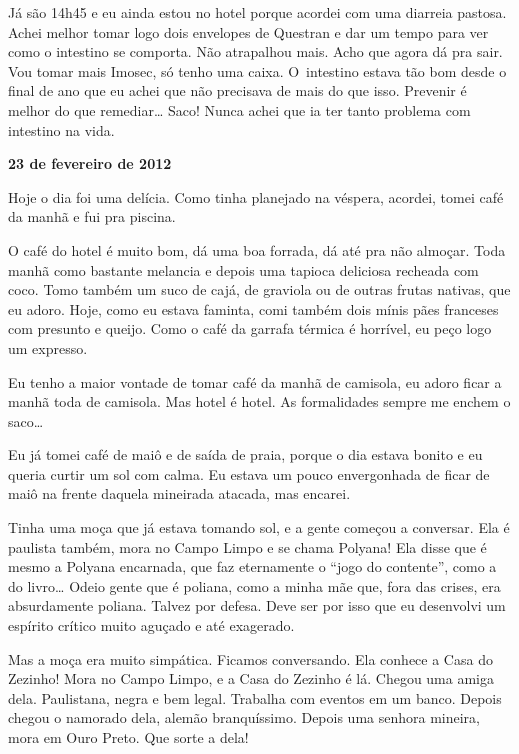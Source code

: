 Já são 14h45 e eu ainda estou no hotel porque acordei com uma diarreia
pastosa. Achei melhor tomar logo dois envelopes de Questran e dar um
tempo para ver como o intestino se comporta. Não atrapalhou mais. Acho
que agora dá pra sair. Vou tomar mais Imosec, só tenho uma caixa. O~intestino estava tão bom desde o final de ano que eu achei que não
precisava de mais do que isso. Prevenir é melhor do que remediar…
Saco! Nunca achei que ia ter tanto problema com intestino na vida.

\begin{center}\asterisc{}\end{center}

\begin{flushright}\textbf{23 de fevereiro de 2012}\end{flushright}


Hoje o dia foi uma delícia. Como tinha planejado na véspera, acordei,
tomei café da manhã e fui pra piscina.

O café do hotel é muito bom, dá uma boa forrada, dá até pra não almoçar.
Toda manhã como bastante melancia e depois uma tapioca deliciosa
recheada com coco. Tomo também um suco de cajá, de graviola ou de outras
frutas nativas, que eu adoro. Hoje, como eu estava faminta, comi também
dois mínis pães franceses com presunto e queijo. Como o café da garrafa
térmica é horrível, eu peço logo um expresso.

Eu tenho a maior vontade de tomar café da manhã de camisola, eu adoro
ficar a manhã toda de camisola. Mas hotel é hotel. As
formalidades sempre me enchem o saco…

Eu já tomei café de maiô e de saída de praia, porque o dia estava bonito
e eu queria curtir um sol com calma. Eu estava um pouco envergonhada de
ficar de maiô na frente daquela mineirada atacada, mas encarei.

Tinha uma moça que já estava tomando sol, e a gente começou a conversar.
Ela é paulista também, mora no Campo Limpo e se chama Polyana! Ela disse
que é mesmo a Polyana encarnada, que faz eternamente o ``jogo do
contente'', como a do livro… Odeio gente que é poliana, como a
minha mãe que, fora das crises, era absurdamente poliana. Talvez por
defesa. Deve ser por isso que eu desenvolvi um espírito crítico muito
aguçado e até exagerado.

Mas a moça era muito simpática. Ficamos conversando. Ela conhece a Casa
do Zezinho! Mora no Campo Limpo, e a Casa do Zezinho é lá. Chegou uma
amiga dela. Paulistana, negra e bem legal. Trabalha com
eventos em um banco. Depois chegou o namorado dela, alemão branquíssimo.
Depois uma senhora mineira, mora em Ouro Preto. Que sorte a dela!

